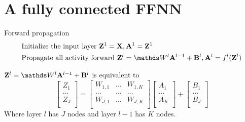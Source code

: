 \newcommand{\cA}{\mathcal{A}} \newcommand{\cB}{\mathcal{B}} \newcommand{\cC}{\mathcal{C}} \newcommand{\cD}{\mathcal{D}} \newcommand{\cE}{\mathcal{E}} \newcommand{\cF}{\mathcal{F}} \newcommand{\cG}{\mathcal{G}} \newcommand{\cH}{\mathcal{H}} \newcommand{\cI}{\mathcal{I}} \newcommand{\cJ}{\mathcal{J}} \newcommand{\cK}{\mathcal{K}} \newcommand{\cL}{\mathcal{L}} \newcommand{\cM}{\mathcal{M}} \newcommand{\cN}{\mathcal{N}} \newcommand{\cO}{\mathcal{O}} \newcommand{\cP}{\mathcal{P}} \newcommand{\cQ}{\mathcal{Q}} \newcommand{\cR}{\mathcal{R}} \newcommand{\cS}{\mathcal{S}} \newcommand{\cT}{\mathcal{T}} \newcommand{\cU}{\mathcal{U}} \newcommand{\cV}{\mathcal{V}} \newcommand{\cW}{\mathcal{W}} \newcommand{\cX}{\mathcal{X}} \newcommand{\cY}{\mathcal{Y}} \newcommand{\cZ}{\mathcal{Z}}

\newcommand{\ewise}[2]{{#1 * #2}} %
\newcommand{\EE}{\mathrm{E}} %
\newcommand{\g}{\,\vert\,} %
\newcommand{\set}[1]{\{{#1}\}}
\newcommand{\size}[1]{\mathrm{\#}(#1)}

\section {A fully connected FFNN} \label {sec: fcffnn}
Forward propagation
\begin {equation} \begin {split}
& \text {Initialize the input layer } \vZ^1 = \vX, \vA^1 = \vZ^1 \\
& \text {Propagate all activity forward } \vZ^l = \mW^l \vA^{l-1} + \vB^l, \vA^l = f^l(\vZ^l) \\
\end {split} \end {equation}

$\vZ^l = \mW^l \vA^{l-1} + \vB^l$ is equivalent to 
\begin{equation} \label {eq: nnwts}
\begin{bmatrix}
Z_1 \\
\ldots \\
Z_J \\
\end{bmatrix}
= 
\begin{bmatrix}
W_{1,1} & \ldots & W_{1,K} \\
\ldots & \ldots & \ldots \\
W_{J,1} & \ldots & W_{J,K} \\
\end{bmatrix}
\begin{bmatrix}
A_1 \\
\ldots \\
A_K \\
\end{bmatrix} 
+
\begin{bmatrix}
B_1 \\
\ldots \\
B_J \\
\end{bmatrix}
\end{equation}
Where layer $l$ has $J$ nodes and layer $l-1$ has $K$ nodes.

